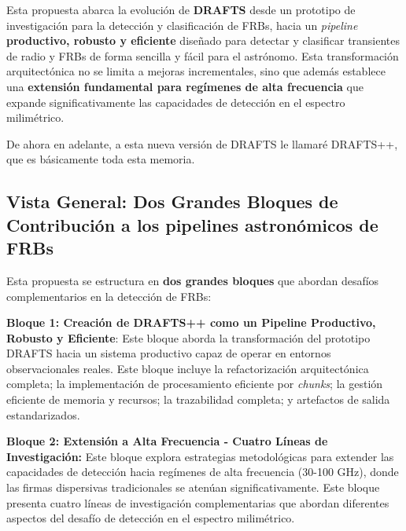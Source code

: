 \setcounter{secnumdepth}{4}
\setcounter{tocdepth}{4}
\makeatletter
\renewcommand\paragraph{\@startsection{paragraph}{4}{\z@}%
  {1.5ex \@plus .5ex \@minus .2ex}%
  {0.8ex \@plus .2ex}%
  {\normalfont\normalsize\bfseries}}  %
\makeatother



Esta propuesta abarca la evolución de \textbf{DRAFTS} \cite{zhang2024drafts} desde un prototipo de investigación para la detección y clasificación de FRBs, hacia un \textit{pipeline} 
\textbf{productivo, robusto y eficiente} diseñado para detectar y clasificar transientes de radio y FRBs de forma sencilla y fácil para el astrónomo. Esta transformación arquitectónica no se limita a 
mejoras incrementales, sino que además establece una \textbf{extensión fundamental para regímenes de alta frecuencia} que expande significativamente las capacidades de 
detección en el espectro milimétrico.

De ahora en adelante, a esta nueva versión de DRAFTS le llamaré DRAFTS++, que es básicamente toda esta memoria.

\subsection{Vista General: Dos Grandes Bloques de Contribución a los pipelines astronómicos de FRBs}

Esta propuesta se estructura en \textbf{dos grandes bloques} que abordan desafíos complementarios en la detección de FRBs:

\textbf{Bloque 1: Creación de DRAFTS++ como un Pipeline Productivo, Robusto y Eficiente}: Este bloque aborda la transformación del prototipo DRAFTS hacia un sistema productivo capaz de operar en entornos observacionales reales.
 Este bloque incluye la refactorización arquitectónica completa; la implementación de procesamiento eficiente por \emph{chunks}; la gestión eficiente de memoria y recursos; la trazabilidad completa; y artefactos de salida estandarizados.

\textbf{Bloque 2: Extensión a Alta Frecuencia - Cuatro Líneas de Investigación:} Este bloque explora estrategias metodológicas para extender las capacidades de detección hacia regímenes de alta frecuencia (30-100 GHz), 
donde las firmas dispersivas tradicionales se atenúan significativamente. Este bloque presenta cuatro líneas de investigación complementarias que abordan diferentes aspectos del desafío de detección en el espectro milimétrico.

